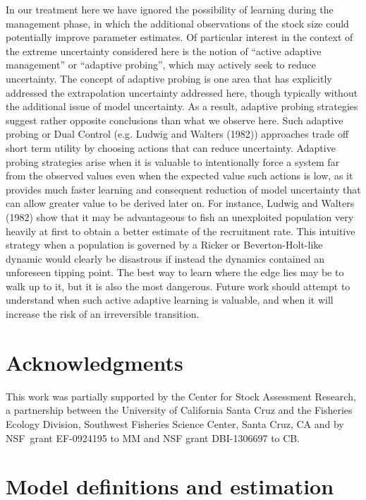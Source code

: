 \documentclass[author-year, review]{elsarticle} %
\begin{document}
In our treatment here we have ignored the possibility of learning during
the management phase, in which the additional observations of the stock
size could potentially improve parameter estimates. Of particular
interest in the context of the extreme uncertainty considered here is
the notion of ``active adaptive management'' or ``adaptive probing'',
which may actively seek to reduce uncertainty. The concept of adaptive
probing is one area that has explicitly addressed the extrapolation
uncertainty addressed here, though typically without the additional
issue of model uncertainty. As a result, adaptive probing strategies
suggest rather opposite conclusions than what we observe here. Such
adaptive probing or Dual Control (e.g. Ludwig and Walters (1982))
approaches trade off short term utility by choosing actions that can
reduce uncertainty. Adaptive probing strategies arise when it is
valuable to intentionally force a system far from the observed values
even when the expected value such actions is low, as it provides much
faster learning and consequent reduction of model uncertainty that can
allow greater value to be derived later on. For instance, Ludwig and
Walters (1982) show that it may be advantageous to fish an unexploited
population very heavily at first to obtain a better estimate of the
recruitment rate. This intuitive strategy when a population is governed
by a Ricker or Beverton-Holt-like dynamic would clearly be disastrous if
instead the dynamics contained an unforeseen tipping point. The best way
to learn where the edge lies may be to walk up to it, but it is also the
most dangerous. Future work should attempt to understand when such
active adaptive learning is valuable, and when it will increase the risk
of an irreversible transition.

\section{Acknowledgments}\label{acknowledgments}

This work was partially supported by the Center for Stock Assessment
Research, a partnership between the University of California Santa Cruz
and the Fisheries Ecology Division, Southwest Fisheries Science Center,
Santa Cruz, CA and by NSF~grant EF-0924195 to MM and NSF grant
DBI-1306697 to CB.

\appendix

\section{Model definitions and
estimation}\label{model-definitions-and-estimation}
\end{document}
